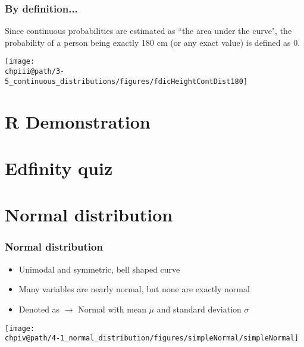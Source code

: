 \documentclass[slidestop,compress,mathserif]{beamer}
\makeatletter
\def\chpiii@path{../../Chp 3}
\def\chpiv@path{../../Chp 4}
\makeatother
\begin{document}

\begin{frame}
\frametitle{By definition...}

Since continuous probabilities are estimated as ``the area under the curve", the probability of a person being exactly 180 cm (or any exact value) is defined as 0.

\begin{center}
\texttt{[image: \\chpiii@path/3-5\_continuous\_distributions/figures/fdicHeightContDist180]}
\end{center}

\end{frame}


\section{R Demonstration}


\section{Edfinity quiz}



\section{Normal distribution}


\begin{frame}
\frametitle{Normal distribution}

\begin{itemize}

\item Unimodal and symmetric, bell shaped curve

\item Many variables are nearly normal, but none are exactly normal

\item Denoted as  $\rightarrow$ Normal with mean $\mu$ and standard deviation $\sigma$

\end{itemize}

\begin{center}
\texttt{[image: \\chpiv@path/4-1\_normal\_distribution/figures/simpleNormal/simpleNormal]}
\end{center}

\end{frame}
\end{document}

